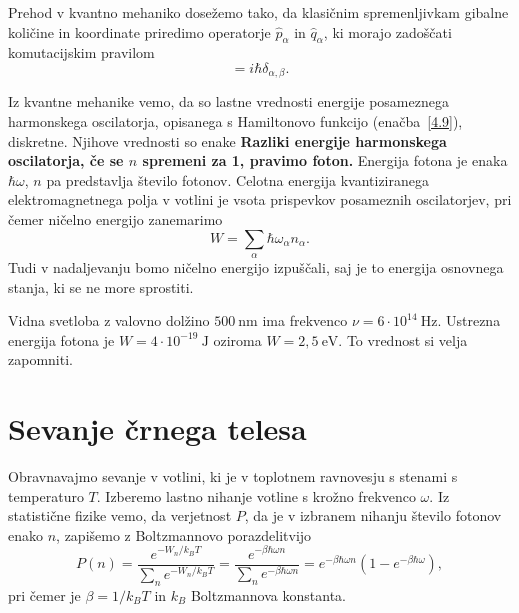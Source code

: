 Prehod v kvantno mehaniko dosežemo tako, da klasičnim spremenljivkam gibalne količine
in koordinate priredimo operatorje $\hat{p}_{\alpha}$ in $\hat{q}_{\alpha}$,
ki morajo zadoščati komutacijskim pravilom 
\begin{equation}
[\hat{q}_{\alpha},\hat{p}_{\beta}]=i\hbar \delta_{\alpha, \beta}.
\label{4.10}
\end{equation}

Iz kvantne mehanike vemo, da so lastne vrednosti energije posameznega harmonskega oscilatorja, 
opisanega s Hamiltonovo funkcijo (enačba~\ref{4.9}), diskretne. Njihove vrednosti so enake
{\bf Razliki energije harmonskega oscilatorja, če se $n$
spremeni za 1, pravimo foton.} Energija
fotona je enaka $\hbar \omega$, $n$ pa predstavlja število fotonov. Celotna
energija kvantiziranega elektromagnetnega polja v votlini je vsota prispevkov
posameznih oscilatorjev, pri čemer ničelno energijo zanemarimo
\begin{equation}
W = \sum_\alpha \hbar \omega_\alpha n_\alpha.
\end{equation}
Tudi v nadaljevanju bomo ničelno energijo izpuščali, 
saj je to energija osnovnega stanja, ki se ne more sprostiti. 

\begin{remark}
Vidna svetloba z valovno dolžino $500~\si{\nano\metre}$ ima frekvenco
$\nu = 6 \cdot 10^{14}~\si{\hertz}$. Ustrezna energija fotona je
$W = 4 \cdot 10^{-19}~\si{\joule}$ oziroma $W = 2,5~\mathrm{e}\si{\volt}$.
To vrednost si velja zapomniti.
\end{remark}

\section{Sevanje črnega telesa}
Obravnavajmo sevanje v votlini, ki je v toplotnem ravnovesju s stenami s temperaturo
$T$. Izberemo lastno nihanje votline s krožno frekvenco $\omega$. Iz statistične fizike 
vemo, da verjetnost $P$, da je v izbranem  nihanju število fotonov enako $n$, 
zapišemo z Boltzmannovo porazdelitvijo
\begin{equation}
P(n)=\frac{e^{-W_{n}/k_BT}}{\sum_{n}e^{-W_{n}/k_BT}} = 
\frac{e^{-\beta\hbar\omega n}}
{\sum_{n}e^{-\beta\hbar\omega n}}=
e^{-\beta\hbar\omega n}(1-e^{-\beta\hbar\omega}),
\label{4.12}
\end{equation}
pri čemer je $\beta = 1/k_BT$ in $k_B$ Boltzmannova konstanta. 

